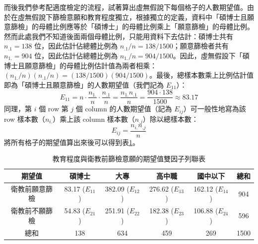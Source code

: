     而後我們參考配適度檢定的流程，試著算出虛無假說下每個格子的人數期望值。由於在虛無假說下篩檢意願和教育程度獨立，根據獨立的定義，資料中「碩博士且願意篩檢」的母體比例應等於「碩博士」的母體比例乘上「願意篩檢」的母體比例。然而此處我們不知道後面兩個母體比例，只能用資料下去估計：碩博士共有 $n_{.1} = 138$ 位，因此估計佔總體比例為 $n_{.1}/n = 138/1500$；願意篩檢者共有 $n_{1.} = 904$ 位，因此估計佔總體比例為 $n_{1.}/n = 904/1500$。因此，虛無假設下「碩博士且願意篩檢」的母體比例估計值為兩者相乘：$(n_{1.}/n)(n_{.1}/n) = (138/1500)(904/1500)$。最後，總樣本數乘上比例估計值即為「碩博士且願意篩檢」的人數期望值（我們記為 $E_{11}$）：
    \[E_{11} = n \cdot \frac{n_{1.}}{n} \cdot \frac{n_{.1}}{n} = \frac{n_{1.}n_{.1}}{n} = \frac{904 \cdot 138}{1500} \approx 83.17\]
    同理，第 $i$ 個 row 第 $j$ 個 column 的人數期望值（記為 $E_{ij}$）可一般性地寫為該 row 樣本數（$n_{i.}$）乘上該 column 樣本數（$n_{.j}$）除以總樣本數：
    \[E_{ij} = \frac{n_{i.}n_{.j}}{n}\]
    將所有格子的期望值算出來後可以得到表\ref{tab:two_way_contingency_exp}。
    \begin{table}[htbp]
        \begin{center}
            \begin{tabular}{c|cccc|c}
                \toprule
                期望值 & 碩博士 & 大專 & 高中職 & 國中以下 & 總和\\
                \hline
                衛教前願意篩檢 & 83.17 ($E_{11}$) & 382.09 ($E_{12}$) & 276.62 ($E_{13}$) & 162.12 ($E_{14}$) & 904\\
                衛教前不願篩檢 & 54.83 ($E_{21}$) & 251.91 ($E_{22}$) & 182.38 ($E_{23}$) & 106.88 ($E_{24}$) & 596\\
                \hline
                總和 & 138 & 634 & 459 & 269 & 1500\\
                \bottomrule
            \end{tabular}
            \caption{教育程度與衛教前篩檢意願的期望值雙因子列聯表\label{tab:two_way_contingency_exp}}
        \end{center}
    \end{table}

